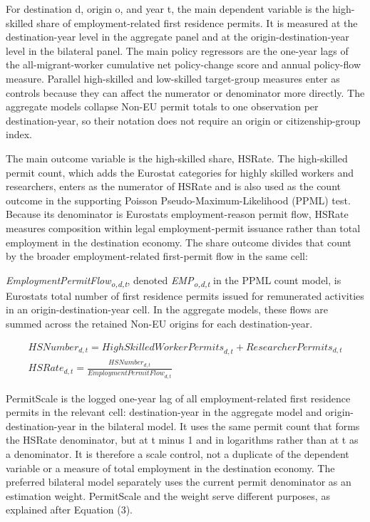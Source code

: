 \documentclass[11pt,a4paper]{article}
\begin{document}
For destination d, origin o, and year t, the main dependent variable is
the high-skilled share of employment-related first residence permits. It
is measured at the destination-year level in the aggregate panel and at
the origin-destination-year level in the bilateral panel. The main
policy regressors are the one-year lags of the all-migrant-worker
cumulative net policy-change score and annual policy-flow measure.
Parallel high-skilled and low-skilled target-group measures enter as
controls because they can affect the numerator or denominator more
directly. The aggregate models collapse Non-EU permit totals to one
observation per destination-year, so their notation does not require an
origin or citizenship-group index.

The main outcome variable is the high-skilled share, HSRate. The
high-skilled permit count, which adds the Eurostat categories for highly
skilled workers and researchers, enters as the numerator of HSRate and
is also used as the count outcome in the supporting Poisson
Pseudo-Maximum-Likelihood (PPML) test. Because its denominator is
Eurostat\textquotesingle s employment-reason permit flow, HSRate
measures composition within legal employment-permit issuance rather than
total employment in the destination economy. The share outcome divides
that count by the broader employment-related first-permit flow in the
same cell:

\emph{EmploymentPermitFlow\textsubscript{o,d,t}}, denoted
\emph{EMP\textsubscript{o,d,t}} in the PPML count model, is
Eurostat\textquotesingle s total number of first residence permits
issued for remunerated activities in an origin-destination-year cell. In
the aggregate models, these flows are summed across the retained Non-EU
origins for each destination-year.

\[\begin{gathered}
{HSNumber}_{d,t} = {HighSkilledWorkerPermits}_{d,t} + {ResearcherPermits}_{d,t} \\
{HSRate}_{d,t} = \frac{{HSNumber}_{d,t}}{{EmploymentPermitFlow}_{d,t}}
\end{gathered}\]

PermitScale is the logged one-year lag of all employment-related first
residence permits in the relevant cell: destination-year in the
aggregate model and origin-destination-year in the bilateral model. It
uses the same permit count that forms the HSRate denominator, but at t
minus 1 and in logarithms rather than at t as a denominator. It is
therefore a scale control, not a duplicate of the dependent variable or
a measure of total employment in the destination economy. The preferred
bilateral model separately uses the current permit denominator as an
estimation weight. PermitScale and the weight serve different purposes,
as explained after Equation (3).
\end{document}
